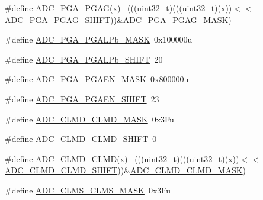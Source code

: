 \begin{DoxyCompactItemize}
\#define \hyperlink{group___a_d_c___register___masks_ga1d4942de079b809f824f89c6b3ac2be1}{A\+D\+C\+\_\+\+P\+G\+A\+\_\+\+P\+G\+AG}(x)                                                ~(((\hyperlink{_p_e___types_8h_a33594304e786b158f3fb30289278f5af}{uint32\+\_\+t})(((\hyperlink{_p_e___types_8h_a33594304e786b158f3fb30289278f5af}{uint32\+\_\+t})(x))$<$$<$\hyperlink{group___a_d_c___register___masks_gaa0979a2ccd896d245b77f053076cf2c6}{A\+D\+C\+\_\+\+P\+G\+A\+\_\+\+P\+G\+A\+G\+\_\+\+S\+H\+I\+FT}))\&\hyperlink{group___a_d_c___register___masks_ga55a340c6fac33dc33fa72db68c8a6576}{A\+D\+C\+\_\+\+P\+G\+A\+\_\+\+P\+G\+A\+G\+\_\+\+M\+A\+SK})
\item 
\#define \hyperlink{group___a_d_c___register___masks_ga55e2d804ae75c3df8afb47b7fefe098f}{A\+D\+C\+\_\+\+P\+G\+A\+\_\+\+P\+G\+A\+L\+Pb\+\_\+\+M\+A\+SK}~0x100000u
\item 
\#define \hyperlink{group___a_d_c___register___masks_ga6d9631a2ca93115d33735cff2b17ebef}{A\+D\+C\+\_\+\+P\+G\+A\+\_\+\+P\+G\+A\+L\+Pb\+\_\+\+S\+H\+I\+FT}~20
\item 
\#define \hyperlink{group___a_d_c___register___masks_ga43041669f7d4bc8d046ed58fd9074e2b}{A\+D\+C\+\_\+\+P\+G\+A\+\_\+\+P\+G\+A\+E\+N\+\_\+\+M\+A\+SK}~0x800000u
\item 
\#define \hyperlink{group___a_d_c___register___masks_gaef8ffbfc9f36f616ad9e05418c5fa5bd}{A\+D\+C\+\_\+\+P\+G\+A\+\_\+\+P\+G\+A\+E\+N\+\_\+\+S\+H\+I\+FT}~23
\item 
\#define \hyperlink{group___a_d_c___register___masks_ga45c4117ad9fba213c3d338cf6280cb75}{A\+D\+C\+\_\+\+C\+L\+M\+D\+\_\+\+C\+L\+M\+D\+\_\+\+M\+A\+SK}~0x3\+Fu
\item 
\#define \hyperlink{group___a_d_c___register___masks_ga872bf108b50c6dd439ddc1294f104fe5}{A\+D\+C\+\_\+\+C\+L\+M\+D\+\_\+\+C\+L\+M\+D\+\_\+\+S\+H\+I\+FT}~0
\item 
\#define \hyperlink{group___a_d_c___register___masks_gada01491a34a2a912a7cdbccac2134da4}{A\+D\+C\+\_\+\+C\+L\+M\+D\+\_\+\+C\+L\+MD}(x)                                              ~(((\hyperlink{_p_e___types_8h_a33594304e786b158f3fb30289278f5af}{uint32\+\_\+t})(((\hyperlink{_p_e___types_8h_a33594304e786b158f3fb30289278f5af}{uint32\+\_\+t})(x))$<$$<$\hyperlink{group___a_d_c___register___masks_ga872bf108b50c6dd439ddc1294f104fe5}{A\+D\+C\+\_\+\+C\+L\+M\+D\+\_\+\+C\+L\+M\+D\+\_\+\+S\+H\+I\+FT}))\&\hyperlink{group___a_d_c___register___masks_ga45c4117ad9fba213c3d338cf6280cb75}{A\+D\+C\+\_\+\+C\+L\+M\+D\+\_\+\+C\+L\+M\+D\+\_\+\+M\+A\+SK})
\item 
\#define \hyperlink{group___a_d_c___register___masks_ga108adc09b24001dddfd498e14213fea6}{A\+D\+C\+\_\+\+C\+L\+M\+S\+\_\+\+C\+L\+M\+S\+\_\+\+M\+A\+SK}~0x3\+Fu

\end{DoxyCompactItemize}
